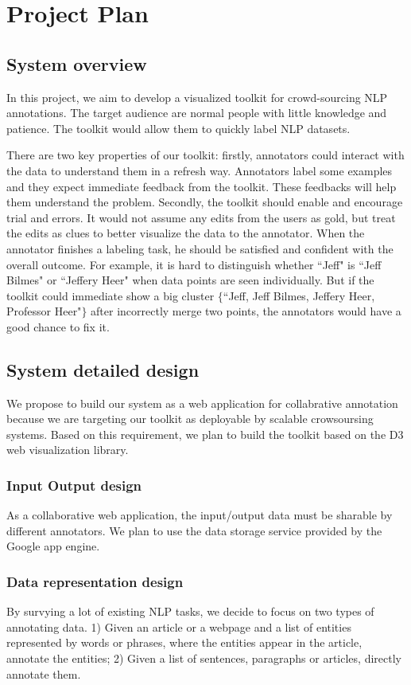 \section{Project Plan} 

\subsection{System overview} In this project,
we aim to develop a visualized toolkit for crowd-sourcing NLP
annotations. The target audience are normal people with little
knowledge and patience. The toolkit would allow them to quickly label
NLP datasets.

There are two key properties of our toolkit: firstly, annotators could
interact with the data to understand them in a refresh way. Annotators
label some examples and they expect immediate feedback from the
toolkit. These feedbacks will help them understand the problem.
Secondly, the toolkit should enable and encourage trial and errors. It
would not assume any edits from the users as gold, but treat the edits
as clues to better visualize the data to the annotator. When the
annotator finishes a labeling task, he should be satisfied and
confident with the overall outcome. For example, it is hard to
distinguish whether ``Jeff" is ``Jeff Bilmes" or ``Jeffery Heer" when
data points are seen individually. But if the toolkit could immediate
show a big cluster $\{$``Jeff, Jeff Bilmes, Jeffery Heer, Professor
Heer"$\}$ after incorrectly merge two points, the annotators would
have a good chance to fix it.

\subsection{System detailed design}

We propose to build our system as a web application for collabrative
annotation because we are targeting our toolkit as deployable by
scalable crowsoursing systems. Based on this requirement, we plan to
build the toolkit based on the D3 web visualization library.

\subsubsection{Input Output design} As a collaborative web
application, the input/output data must be sharable by different
annotators. We plan to use the data storage service provided by the
Google app engine. 

\subsubsection{Data representation design} By survying a lot of
existing NLP tasks, we decide to focus on two types of annotating
data. 1) Given an article or a webpage and a list of entities
represented by words or phrases, where the entities appear in the
article, annotate the entities; 2) Given a list of sentences,
paragraphs or articles, directly annotate them. 


